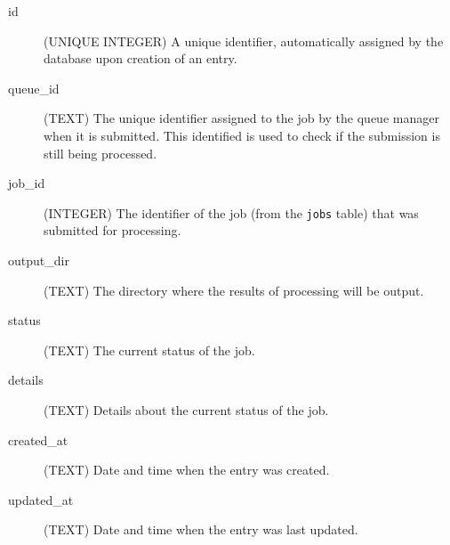 \begin{description}
    \item[id] (UNIQUE INTEGER)  A unique identifier, automatically assigned by the database upon creation of an entry.
    \item[queue\_id] (TEXT) The unique identifier assigned to the job by the queue manager when it is submitted. This identified is used to check if the submission is still being processed.
    \item[job\_id] (INTEGER) The identifier of the job (from the \texttt{jobs} table) that was submitted for processing.
    \item[output\_dir] (TEXT) The directory where the results of processing will be output.
    \item[status] (TEXT) The current status of the job.
    \item[details] (TEXT) Details about the current status of the job.
    \item[created\_at] (TEXT) Date and time when the entry was created.
    \item[updated\_at] (TEXT) Date and time when the entry was last updated.
\end{description}


